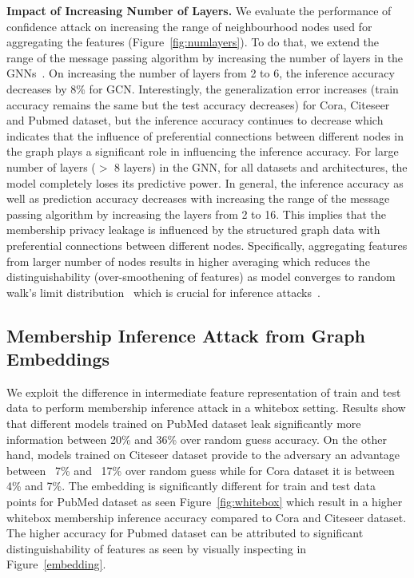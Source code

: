 \textbf{Impact of Increasing Number of Layers.} We evaluate the performance of confidence attack on increasing the range of neighbourhood nodes used for aggregating the features (Figure~\ref{fig:numlayers}).
To do that, we extend the range of the message passing algorithm by increasing the number of layers in the GNNs~\cite{klicpera2018combining,Li2018DeeperII}.
On increasing the number of layers from 2 to 6, the inference accuracy decreases by 8\% for GCN. %
Interestingly, the generalization error increases (train accuracy remains the same but the test accuracy decreases) for Cora, Citeseer and Pubmed dataset, but the inference accuracy continues to decrease which indicates that the influence of preferential connections between different nodes in the graph plays a significant role in influencing the inference accuracy. %
For large number of layers ($>$ 8 layers) in the GNN, for all datasets and architectures, the model completely loses its predictive power.
In general, the inference accuracy as well as prediction accuracy decreases with increasing the range of the message passing algorithm by increasing the layers from 2 to 16.
This implies that the membership privacy leakage is influenced by the structured graph data with preferential connections between different nodes.
Specifically, aggregating features from larger number of nodes results in higher averaging which reduces the distinguishability (over-smoothening of features) as model converges to random walk’s limit distribution~\cite{klicpera2018combining,Li2018DeeperII} which is crucial for inference attacks~\cite{membershipinf,ndss19salem}.








\subsection{Membership Inference Attack from Graph Embeddings}

We exploit the difference in intermediate feature representation of train and test data to perform membership inference attack in a whitebox setting.
Results show that different models trained on PubMed dataset leak significantly more information between 20\% and 36\% over random guess accuracy.
On the other hand, models trained on Citeseer dataset provide to the adversary an advantage between ~7\% and ~17\% over random guess while for Cora dataset it is between 4\% and 7\%.
The embedding is significantly different for train and test data points for PubMed dataset as seen Figure~\ref{fig:whitebox} which result in a higher whitebox membership inference accuracy compared to Cora and Citeseer dataset.
The higher accuracy for Pubmed dataset can be attributed to significant distinguishability of features as seen by visually inspecting in Figure~\ref{embedding}.

